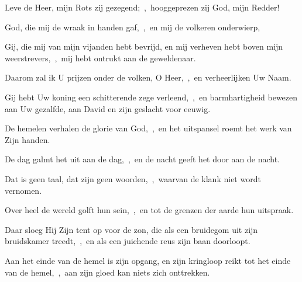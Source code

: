 \documentclass[12pt,twoside,a5paper]{article}
\begin{document}
\begin{halfparskip}
  Leve de Heer, mijn Rots zij gezegend;~\sep\ hooggeprezen zij God, mijn Redder!

  God, die mij de wraak in handen gaf,~\sep\ en mij de volkeren onderwierp,

  Gij, die mij van mijn vijanden hebt bevrijd, en mij verheven hebt boven mijn weerstrevers,~\sep\ mij hebt ontrukt aan de geweldenaar.

  Daarom zal ik U prijzen onder de volken, O Heer,~\sep\ en verheerlijken Uw Naam.

  Gij hebt Uw koning een schitterende zege verleend,~\sep\ en barmhartigheid bewezen aan Uw gezalfde, aan David en zijn geslacht voor eeuwig.
\end{halfparskip}





\begin{halfparskip}
  De hemelen verhalen de glorie van God,~\sep\ en het uitspansel roemt het werk van Zijn handen.


  De dag galmt het uit aan de dag,~\sep\ en de nacht geeft het door aan de nacht.

  Dat is geen taal, dat zijn geen woorden,~\sep\ waarvan de klank niet wordt vernomen.

  Over heel de wereld golft hun sein,~\sep\ en tot de grenzen der aarde hun uitspraak.

  Daar sloeg Hij Zijn tent op voor de zon, die als een bruidegom uit zijn bruidskamer treedt,~\sep\ en als een juichende reus zijn baan doorloopt.

  Aan het einde van de hemel is zijn opgang, en zijn kringloop reikt tot het einde van de hemel,~\sep\ aan zijn gloed kan niets zich onttrekken.
\end{halfparskip}

\end{document}
